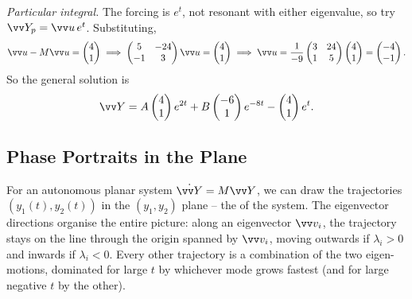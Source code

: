 \begin{example}
	\emph{Particular integral.} The forcing is $e^t$, not resonant with either eigenvalue, so try $\vv Y_p = \vv u \, e^t$. Substituting,
	$$
	\vv u - M \vv u = \begin{pmatrix} 4 \\ 1 \end{pmatrix} \implies \begin{pmatrix} 5 & -24 \\ -1 & 3 \end{pmatrix} \vv u = \begin{pmatrix} 4 \\ 1 \end{pmatrix} \implies \vv u = \frac{1}{-9}\begin{pmatrix} 3 & 24 \\ 1 & 5 \end{pmatrix}\begin{pmatrix} 4 \\ 1\end{pmatrix} = \begin{pmatrix} -4 \\ -1 \end{pmatrix}.
	$$
	So the general solution is
	$$
	\vv Y = A \begin{pmatrix} 4 \\ 1 \end{pmatrix} e^{2t} + B \begin{pmatrix} -6 \\ 1 \end{pmatrix} e^{-8t} - \begin{pmatrix} 4 \\ 1 \end{pmatrix} e^t.
	$$
\end{example}

\subsection{Phase Portraits in the Plane}

For an autonomous planar system $\dot{\vv Y} = M \vv Y$, we can draw the trajectories $(y_1(t), y_2(t))$ in the $(y_1, y_2)$ plane -- the  of the system. The eigenvector directions organise the entire picture: along an eigenvector $\vv v_i$, the trajectory stays on the line through the origin spanned by $\vv v_i$, moving outwards if $\lambda_i > 0$ and inwards if $\lambda_i < 0$. Every other trajectory is a combination of the two eigen-motions, dominated for large $t$ by whichever mode grows fastest (and for large negative $t$ by the other).


